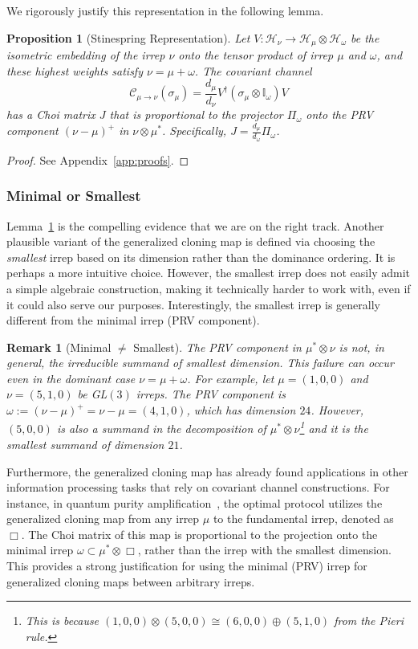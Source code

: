\documentclass[a4paper,onecolumn,11pt]{quantumarticle}
\newtheorem{prop}{Proposition}
\newtheorem{rem}{Remark}
\def\id{\mathbb{I}}
\begin{document}
We rigorously justify this representation in the following lemma.

\begin{prop}[Stinespring Representation]\label{prop:choi}
    Let $V: \mathcal{H}_\nu \to \mathcal{H}_\mu \otimes \mathcal{H}_\omega$ be the isometric embedding of the irrep $\nu$ onto the tensor product of irrep $\mu$ and $\omega$, and these highest weights satisfy $\nu = \mu + \omega$. The covariant channel $$\mathcal{C}_{\mu \to \nu}(\sigma_\mu) = \frac{d_\mu}{d_\nu} V^\dagger (\sigma_\mu\otimes \id_\omega) V$$ has a Choi matrix $J$ that is proportional to the projector $\Pi_\omega$ onto the PRV component $(\nu - \mu)^+$ in $\nu \otimes \mu^*$. Specifically, $J = \frac{d_\mu}{d_\omega} \Pi_\omega$.
\end{prop}
\begin{proof}See Appendix~\ref{app:proofs}.
\end{proof}


\subsubsection{Minimal or Smallest}
Lemma~\ref{prop:choi} is the compelling evidence that we are on the right track. Another plausible variant of the generalized cloning map is defined via choosing the \emph{smallest} irrep based on its dimension rather than the dominance ordering. It is perhaps a more intuitive choice. However, the smallest irrep does not easily admit a simple algebraic construction, making it technically harder to work with, even if it could also serve our purposes. Interestingly, the smallest irrep is generally different from the minimal irrep (PRV component). 
\begin{rem}[Minimal $\neq$ Smallest]\label{rem:prv_not_dim_min}
The PRV component in \(\mu^*\otimes \nu\) is not, in general, the irreducible summand of smallest dimension. This failure can occur even in the dominant case $\nu=\mu+\omega$. For example, let $\mu=(1,0,0)$ and $\nu=(5,1,0)$ be GL\((3)\) irreps. The PRV component is $\omega:=(\nu-\mu)^+ = \nu-\mu=(4,1,0)$, which has dimension $24$. However, $(5,0,0)$ is also a summand in the decomposition of $\mu^*\otimes \nu$\footnote{This is because $(1,0,0)\otimes (5,0,0)\cong(6,0,0)\oplus (5,1,0)$ from the Pieri rule.} and it is the smallest summand of dimension $21$.
\end{rem}



Furthermore, the generalized cloning map has already found applications in other information processing tasks that rely on covariant channel constructions. For instance, in quantum purity amplification~\cite{keyl2001rate,li2025purity}, the optimal protocol utilizes the generalized cloning map from any irrep $\mu$ to the fundamental irrep, denoted as~$\Box$. The Choi matrix of this map is proportional to the projection onto the minimal irrep $\omega\subset \mu^*\otimes\Box$, rather than the irrep with the smallest dimension. This provides a strong justification for using the minimal (PRV) irrep for generalized cloning maps between arbitrary irreps.
\end{document}

